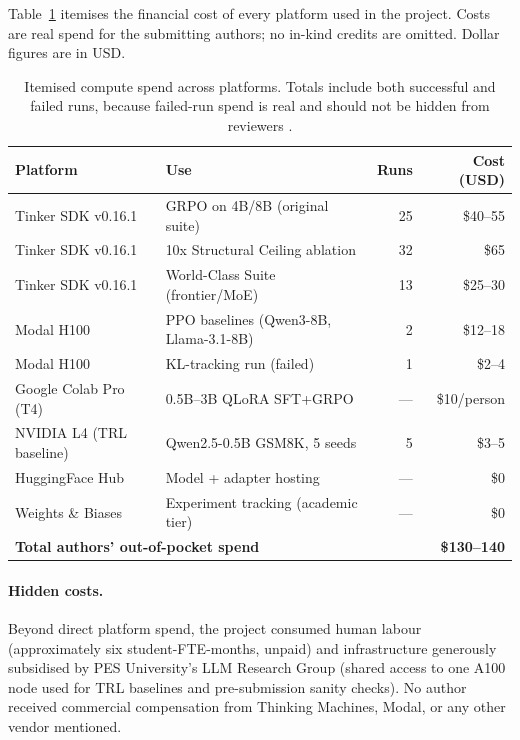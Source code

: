 Table~\ref{tab:compute_spend} itemises the financial cost of every
platform used in the project. Costs are real spend for the submitting
authors; no in-kind credits are omitted. Dollar figures are in USD.

\begin{table}[h]
\centering
\small
\caption{Itemised compute spend across platforms. Totals include both
successful and failed runs, because failed-run spend is real and should
not be hidden from reviewers \cite{henderson2018deep}.}
\label{tab:compute_spend}
\begin{tabular}{llrr}
\toprule
\textbf{Platform} & \textbf{Use} & \textbf{Runs} & \textbf{Cost (USD)} \\
\midrule
Tinker SDK v0.16.1 & GRPO on 4B/8B (original suite)        & 25 & \$40--55 \\
Tinker SDK v0.16.1 & 10x Structural Ceiling ablation       & 32 & \$65 \\
Tinker SDK v0.16.1 & World-Class Suite (frontier/MoE)      & 13 & \$25--30 \\
Modal H100         & PPO baselines (Qwen3-8B, Llama-3.1-8B)& 2  & \$12--18 \\
Modal H100         & KL-tracking run (failed)              & 1  & \$2--4   \\
Google Colab Pro (T4) & 0.5B--3B QLoRA SFT+GRPO            & --- & \$10/person \\
NVIDIA L4 (TRL baseline)& Qwen2.5-0.5B GSM8K, 5 seeds      & 5  & \$3--5   \\
HuggingFace Hub    & Model + adapter hosting               & --- & \$0 \\
Weights \& Biases  & Experiment tracking (academic tier)   & --- & \$0 \\
\midrule
\multicolumn{3}{l}{\textbf{Total authors' out-of-pocket spend}} & \textbf{\$130--140} \\
\bottomrule
\end{tabular}
\end{table}

\paragraph{Hidden costs.} Beyond direct platform spend, the project
consumed human labour (approximately six student-FTE-months, unpaid) and
infrastructure generously subsidised by PES University's LLM Research
Group (shared access to one A100 node used for TRL baselines and
pre-submission sanity checks). No author received commercial compensation
from Thinking Machines, Modal, or any other vendor mentioned.


